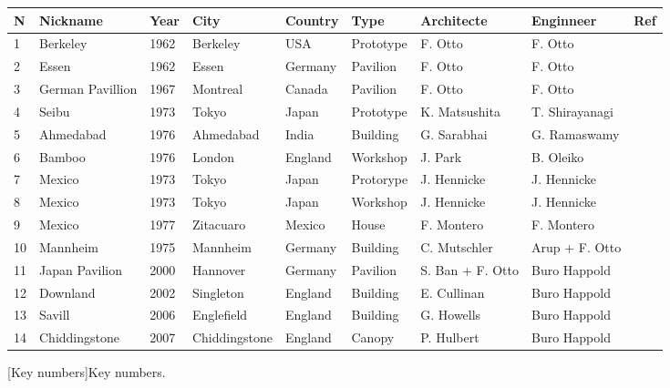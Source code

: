 \begin{landscape}%
\begin{table}[p]
\centering\small
{}
 	\begin{tabularx}{20cm}{@{}l X l l l l l l r@{}}
	\toprule
 	N	& Nickname		& Year	& City			& Country		& Type		& Architecte 			& Enginneer			& Ref \\ 
	\midrule
	1 	& Berkeley		& 1962	& Berkeley		& USA		& Prototype	& F. Otto	 			& F. Otto				& \cite{IL10} \\
	2 	& Essen			& 1962	& Essen			& Germany	& Pavilion		& F. Otto	 			& F. Otto				& \cite{IL10} \\
	3 	& German Pavillion	& 1967	& Montreal		& Canada		& Pavilion		& F. Otto	 			& F. Otto				& \cite{IL10} \\
	4 	& Seibu			& 1973	& Tokyo			& Japan		& Prototype	& K. Matsushita	 		& T. Shirayanagi		& \cite[p.~245]{IL13} \\
	5 	& Ahmedabad		& 1976	& Ahmedabad		& India		& Building		& G. Sarabhai 			& G. Ramaswamy		& \cite[p.~249]{IL13} \\
	6 	& Bamboo			& 1976	& London			& England		& Workshop	& J. Park 				& B. Oleiko			& \cite{IL13} \\

	7 	& Mexico			& 1973	& Tokyo			& Japan		& Protorype	& J. Hennicke			& J. Hennicke			& \cite{IL13} \\
	8 	& Mexico			& 1973	& Tokyo			& Japan		& Workshop	& J. Hennicke			& J. Hennicke			& \cite{IL13} \\

	9 	& Mexico			& 1977	& Zitacuaro		& Mexico		& House		& F. Montero			& F. Montero			& \cite{IL13} \\

	\midrule
	10 	& Mannheim		& 1975	& Mannheim		& Germany	& Building		& C. Mutschler 	 		& Arup + F. Otto  		& \cite{IL13} \\
	11 	& Japan Pavilion	& 2000	& Hannover		& Germany	& Pavilion		& S. Ban + F. Otto		& Buro Happold 		& \cite{} \\
	12 	& Downland		& 2002	& Singleton		& England		& Building		& E. Cullinan	 		& Buro Happold		& \cite{Harris2003} \\
	13 	& Savill			& 2006	& Englefield		& England		& Building		& G. Howells			& Buro Happold		& \cite{Harris2008} \\
	14 	& Chiddingstone	& 2007	& Chiddingstone	& England		& Canopy		& P. Hulbert			& Buro Happold		& \cite{} \\
	
	\bottomrule
 	\end{tabularx}
[Key numbers]{Key numbers.}
\end{table}
\end{landscape}%



